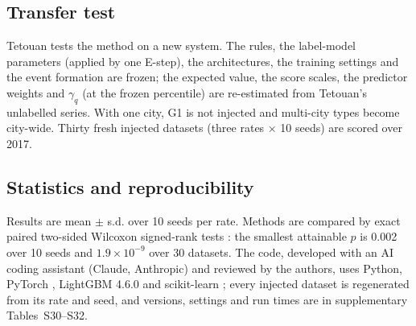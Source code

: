 \subsection{Transfer test}\label{sec:transfer}

Tetouan tests the method on a new system. The rules, the label-model parameters (applied by one E-step), the architectures, the training settings and the event formation are frozen; the expected value, the score scales, the predictor weights and $\gamma_q$ (at the frozen percentile) are re-estimated from Tetouan's unlabelled series. With one city, G1 is not injected and multi-city types become city-wide. Thirty fresh injected datasets (three rates $\times$ 10 seeds) are scored over 2017.

\subsection{Statistics and reproducibility}\label{sec:statistics}

Results are mean $\pm$ s.d. over 10 seeds per rate. Methods are compared by exact paired two-sided Wilcoxon signed-rank tests \cite{wilcoxon1945}: the smallest attainable $p$ is 0.002 over 10 seeds and $1.9 \times 10^{-9}$ over 30 datasets. The code, developed with an AI coding assistant (Claude, Anthropic) and reviewed by the authors, uses Python, PyTorch \cite{paszke2019pytorch}, LightGBM 4.6.0 \cite{ke2017lightgbm} and scikit-learn \cite{pedregosa2011sklearn}; every injected dataset is regenerated from its rate and seed, and versions, settings and run times are in supplementary Tables~S30--S32.

